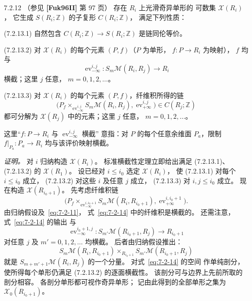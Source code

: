 \begin{lemma}{7.2.12}\label{lem:7-2-12}
（参见 \textbf{[Fuk96II]} 第 97 页）
存在 $R_i$ 上光滑奇异单形的
可数集 $\mathcal X(R_i)$，
它生成 $S(R_i;\mathbb Z)$
的子复形 $C(R_i;\mathbb Z)$，
满足下列性质：

\noindent\textup{(7.2.13.1)}\quad
自然包含
$C(R_i;\mathbb Z)\to S(R_i;\mathbb Z)$
是链同伦等价。

\noindent\textup{(7.2.13.2)}\quad
对 $\mathcal X(R_i)$ 的每个元素
$(P,f)$（$P$ 为单形，
$f\colon P\to R_i$ 为映射），
$f$ 均与
\[
\operatorname{ev}^{i,j}_{-\infty}
\colon S_m\mathcal M(R_i,R_j)
\longrightarrow R_i
\]
横截；这里 $j$ 任意，
$m=0,1,2,\ldots$。

\noindent\textup{(7.2.13.3)}\quad
对 $\mathcal X(R_i)$ 的每个元素
$(P,f)$，纤维积所得的链
\[
\bigl(
P_f\mathop{\times}_{\operatorname{ev}^{i,j}_{-\infty}}
S_m\mathcal M(R_i,R_j),
\operatorname{ev}^{i,j}_{+\infty}
\bigr)
\in C(R_j;\mathbb Z)
\]
都可分解为 $\mathcal X(R_j)$
中的元素；这里 $j$ 任意，
$m=0,1,2,\ldots$。
\end{lemma}

这里“$f\colon P\to R_i$
与 $\operatorname{ev}^{i,j}_{-\infty}$ 横截”
意指：对 $P$ 的每个任意余维面
$P_a$，限制
$f|_{P_a}\colon P_a\to R_i$
均与该评价映射横截。

\noindent\textit{证明。}
对 $i$ 归纳构造 $\mathcal X(R_i)$。
标准横截性定理立即给出满足
(7.2.13.1)、(7.2.13.2) 的
$\mathcal X(R_1)$。
设已经对 $i\le i_0$
选定 $\mathcal X(R_i)$，
使 (7.2.13.1) 对每个
$i\le i_0$ 成立，
(7.2.13.2) 对这些 $i$ 及任意 $j$ 成立，
(7.2.13.3) 对 $i,j\le i_0$ 成立。
现在构造 $\mathcal X(R_{i_0+1})$。
先考虑纤维积链
\begin{equation}
\bigl(
P_f\mathop{\times}_{\operatorname{ev}^{i,i_0+1}_{-\infty}}
S_m\mathcal M(R_i,R_{i_0+1}),
\operatorname{ev}^{i,i_0+1}_{+\infty}
\bigr).
\tag{7.2.14}\label{eq:7-2-14}
\end{equation}
由归纳假设及~\eqref{eq:7-2-11}，
式~\eqref{eq:7-2-14}
中的纤维积是横截的。
还需注意，
式~\eqref{eq:7-2-14} 的输出
与
\[
\operatorname{ev}^{i_0+1,j}_{-\infty}
\colon S_{m'}\mathcal M(R_{i_0+1},R_j)
\longrightarrow R_{i_0+1}
\]
对任意 $j$ 及
$m'=0,1,2,\ldots$ 均横截。
后者由归纳假设推出：
\[
S_m\mathcal M(R_i,R_{i_0+1})
\mathop{\times}_{R_{i_0+1}}
S_{m'}\mathcal M(R_{i_0+1},R_j)
\]
就是
$S_{m+m'+1}\mathcal M(R_i,R_j)$
的一个分量。
对式~\eqref{eq:7-2-14} 的空间
作单纯剖分，
使所得每个单形仍满足
(7.2.13.2) 的逐面横截性。
该剖分可与边界上先前所取的剖分相容。
各剖分单形都可视作奇异单形；
记由此得到的全部单形之集为
$\mathcal X_0(R_{i_0+1})$。

